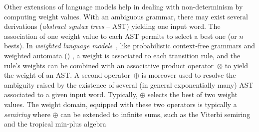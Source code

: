 Other extensions of language models  %
help in dealing with non-determinism by computing weight values.
With an ambiguous grammar, 
there may exist several derivations
(\emph{abstract syntax trees} -- AST) %
yielding one input word. %
The association of one weight value %
to each AST permits to select a best one (or $n$ bests). %
In \emph{weighted language models}~\cite{Goodman99SemiringParsing,Nederhof03weightedParsing,MorbitzVogler19weighted-parsing},
like \eg probabilistic context-free grammars %
and weighted automata (\WA) \cite{Droste09handbook},
a weight is associated to each transition rule, %
and the rule's weights can be combined with an
associative product operator~$\otimes$ to yield the weight of an AST.
A second operator~$\oplus$
is moreover used to resolve the ambiguity raised by the existence
of several (in general exponentially many) AST
associated to a given input word.
Typically, $\oplus$  selects the best of two weight values.
The weight domain, equipped with these two operators is typically 
a \emph{semiring} %
where $\oplus$ can be extended to infinite sums,
such as the Viterbi semiring and the tropical min-plus algebra%

